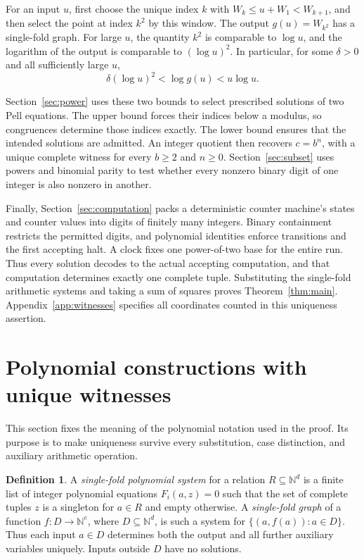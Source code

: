 \documentclass[11pt]{article}
\theoremstyle{definition}
\newtheorem{definition}[theorem]{Definition}
\theoremstyle{remark}
\newcommand{\NN}{\mathbb N}
\begin{document}
For an input $u$, first choose the unique index $k$ with
$W_k\le u+W_1<W_{k+1}$, and then select the point at index $k^2$ by this
window. The output $g(u)=W_{k^2}$ has a single-fold graph. For large $u$, the quantity $k^2$ is comparable to $\log u$, and the
logarithm of the output is comparable to $(\log u)^2$. In particular, for some $\delta>0$ and all sufficiently
large $u$,
\[
 \delta(\log u)^2<\log g(u)<u\log u.
\]

Section~\ref{sec:power} uses these two bounds to select prescribed solutions
of two Pell equations. The upper bound forces their indices below a modulus,
so congruences determine those indices exactly. The lower bound ensures that
the intended solutions are admitted. An integer quotient then recovers
$c=b^n$, with a unique complete witness for every $b\ge2$ and $n\ge0$.
Section~\ref{sec:subset} uses powers and binomial parity to test whether
every nonzero binary digit of one integer is also nonzero in another.

Finally, Section~\ref{sec:computation} packs a deterministic counter
machine's states and counter values into digits of finitely many integers.
Binary containment restricts the permitted digits, and polynomial identities
enforce transitions and the first accepting halt. A clock fixes one
power-of-two base for the entire run. Thus every solution decodes to the
actual accepting computation, and that computation determines exactly one
complete tuple. Substituting the single-fold arithmetic systems and taking
a sum of squares proves Theorem~\ref{thm:main}.
Appendix~\ref{app:witnesses} specifies all coordinates counted in this
uniqueness assertion.

\section{Polynomial constructions with unique witnesses}\label{sec:conventions}
This section fixes the meaning of the polynomial notation used in the proof.
Its purpose is to make uniqueness survive every substitution, case distinction,
and auxiliary arithmetic operation.

\begin{definition}
A \emph{single-fold polynomial system} for a relation $R\subseteq\NN^d$ is a
finite list of integer polynomial equations $F_i(a,z)=0$ such that the set of
complete tuples $z$ is a singleton for $a\in R$ and empty otherwise.
A \emph{single-fold graph} of a function $f:D\to\NN^e$, where
$D\subseteq\NN^d$, is such a system for
$\{(a,f(a)):a\in D\}$. Thus each input $a\in D$ determines both the output and
all further auxiliary variables uniquely. Inputs outside $D$ have no solutions.
\end{definition}
\end{document}
